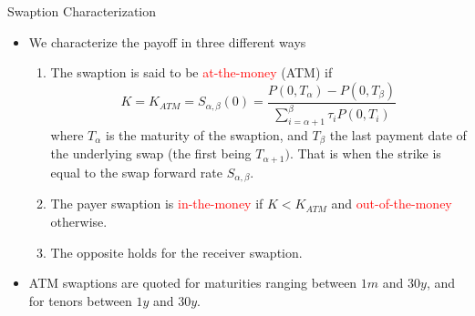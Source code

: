 \documentclass{beamer}
\begin{document}
\begin{frame}{Swaption Characterization}
	\begin{itemize}	
		\item We characterize the payoff in three different ways
		\begin{enumerate}
			\item The swaption is said to be \textcolor{red}{at-the-money} (ATM) if
			\begin{equation*}
				K = K_{ATM} = S_{\alpha,\beta}(0) = \frac{P(0,T_\alpha)-P(0,T_\beta)}{\sum_{i=\alpha+1}^\beta \tau_i P(0,T_i)}
			\end{equation*}
			where $T_\alpha$ is the maturity of the swaption, and $T_\beta$ the last payment date of the underlying swap (the first being $T_{\alpha+1})$. That is when the strike is equal to the swap forward rate $S_{\alpha,\beta}$.
			\item The payer swaption is \textcolor{red}{in-the-money} if $K<K_{ATM}$ and \textcolor{red}{out-of-the-money} otherwise.
			\item The opposite holds for the receiver swaption.
		\end{enumerate}
		\item ATM swaptions are quoted for maturities ranging between $1m$ and $30y$, and for tenors between $1y$ and $30y$.
	\end{itemize}
\end{frame}

%
\end{document}
